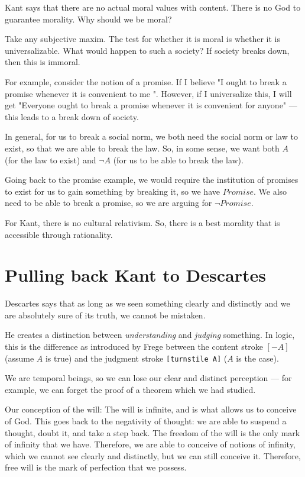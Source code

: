 \documentclass[11pt]{book}
\begin{document}
Kant says that there are no actual moral values with content.
There is no God to guarantee morality.
Why should we be moral?

Take any subjective maxim. The test for whether it is moral is whether
it is universalizable. What would happen to such a society? If society
breaks down, then this is immoral.

For example, consider the notion of a promise. If I believe "I ought
to break a promise whenever it is convenient to me ". However, if I
universalize this, I will get "Everyone ought to break a promise
whenever it is convenient for anyone" --- this leads to a break down
of society.

In general, for us to break a social norm, we both need the social norm
or law to exist, so that we are able to break the law. So, in some sense,
we want both $A$ (for the law to exist) and ${\lnot A}$
(for us to be able to break the law).

Going back to the promise example, we would require the institution of promises
to exist for us to gain something by breaking it, so we have $Promise$. We also need
to be able to break a promise, so we are arguing for $\lnot Promise$.

For Kant, there is no cultural relativism. So, there is a best morality that is
accessible through rationality.

\section{Pulling back Kant to Descartes}

Descartes says that as long as we seen something clearly and distinctly and we
are absolutely sure of its truth, we cannot be mistaken. 

He creates a distinction between \emph{understanding} and \emph{judging}
something. In logic, this is the difference as introduced by Frege between the
content stroke $[- A]$(assume $A$ is true) and  the judgment stroke \texttt{[turnstile A]}
($A$ is the case).

We are temporal beings, so we can lose our clear and distinct perception --- for example,
we can forget the proof of a theorem which we had studied.

Our conception of the will: The will is infinite, and is what allows us to conceive of God.
This goes back to the negativity of thought: we are able to suspend a thought,
doubt it, and take a step back. The freedom of the will is the only mark of infinity
that we have. Therefore, we are able to conceive of notions of infinity, which we cannot
see clearly and distinctly, but we can still conceive it. Therefore, free will is
the mark of perfection that we possess. 
\end{document}
